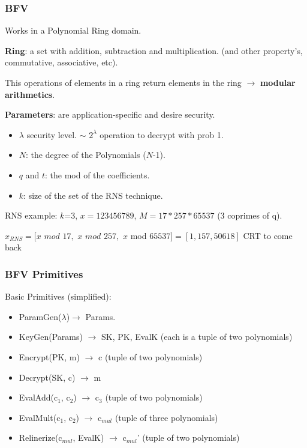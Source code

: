 \documentclass[10pt]{beamer}
\begin{document}
\begin{frame}
    \frametitle{BFV}
Works in a Polynomial Ring domain.

 \vspace{-0.2cm}
\textbf{Ring}: a set with addition, subtraction and multiplication. (and other property's, commutative, associative, etc).

 \vspace{-0.2cm}
    This operations of elements in a ring return elements in the ring $\rightarrow$  \textbf{modular arithmetics}.

 \vspace{-0.2cm}
\textbf{Parameters}: are application-specific and desire security.

 \vspace{-0.3cm}
\begin{itemize}\itemsep-0.7em
    \item $\lambda$ security level. $\sim$ $2^\lambda$ operation to decrypt with prob 1.
    \item $N$: the degree of the Polynomials ($N$-1).
    \item $q$ and $t$: the mod of the coefficients.
    \item $k$: size of the set of the RNS technique.
\end{itemize}
    RNS example: $k$=3, $x=123456789$, $M = 17 * 257 * 65537$ (3 coprimes of q).

    $x_{RNS} = [x$ $mod$ $17,$ $x$ $mod$ $257,$ $x$ mod $ 65537] = [1, 157, 50618]$ CRT to come back
\end{frame}



\begin{frame}
\frametitle{BFV Primitives}

    Basic Primitives (simplified):
\begin{itemize}\itemsep-0.7em
    \item ParamGen($\lambda$)$\rightarrow$ Params.
    \item KeyGen(Params) $\rightarrow$ SK, PK, EvalK (each is a tuple of two polynomials)
    \item Encrypt(PK, m) $\rightarrow$ c (tuple of two polynomials)
    \item Decrypt(SK, c) $\rightarrow$ m
    \item EvalAdd(c$_1$, c$_2$) $\rightarrow$ c$_3$ (tuple of two polynomials)
    \item EvalMult(c$_1$, c$_2$) $\rightarrow$ c$_{mul}$ (tuple of three polynomials)
    \item Relinerize(c$_{mul}$, EvalK) $\rightarrow$ c$_{mul}$' (tuple of two polynomials)
\end{itemize}

\end{frame}
\end{document}
